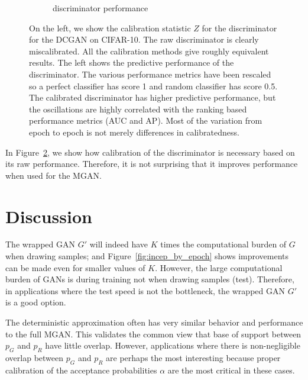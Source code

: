 \documentclass{article}
\newcommand{\PG}{{p_G}}
\newcommand{\PR}{{p_R}}
\newcommand{\accept}{\alpha}
\begin{document}
\begin{figure}
\begin{subfigure}[b]{0.49\textwidth}
       \caption{discriminator performance}
       \label{fig:discriminator_perf}
    \end{subfigure}
    \caption{{\small
    On the left, we show the calibration statistic $Z$ for the discriminator for the DCGAN on CIFAR-10.
    The raw discriminator is clearly miscalibrated.
    All the calibration methods give roughly equivalent results.
    The left shows the predictive performance of the discriminator.
    The various performance metrics have been rescaled so a perfect classifier has score 1 and random classifier has score 0.5.
    The calibrated discriminator has higher predictive performance, but the oscillations are highly correlated with the ranking based performance metrics (AUC and AP)\@.
    Most of the variation from epoch to epoch is not merely differences in calibratedness.
    }}
    \label{fig:calibration}
\end{figure}

In Figure~\ref{fig:calibration}, we show how calibration of the discriminator is necessary based on its raw performance.
Therefore, it is not surprising that it improves performance when used for the MGAN\@.


\section{Discussion}
\label{sec:Discussion}

The wrapped GAN $G'$ will indeed have $K$ times the computational burden of $G$ when drawing samples; and Figure~\ref{fig:incep_by_epoch} shows improvements can be made even for smaller values of $K$.
However, the large computational burden of GANs is during training not when drawing samples (test)\@.
Therefore, in applications where the test speed is not the bottleneck, the wrapped GAN $G'$ is a good option.

The deterministic approximation often has very similar behavior and performance to the full MGAN\@.
This validates the common view that base of support between $\PG$ and $\PR$ have little overlap.
However, applications where there is non-negligible overlap between $\PG$ and $\PR$ are perhaps the most interesting because proper calibration of the acceptance probabilities $\accept$ are the most critical in these cases.
\end{document}
